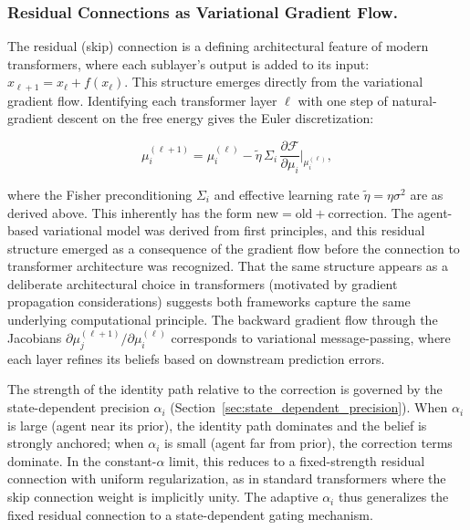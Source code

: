 \documentclass[twoside,11pt]{article}
\begin{document}
\subsubsection{Residual Connections as Variational Gradient Flow.}
\label{sec:residual_connections}

The residual (skip) connection is a defining architectural feature of modern transformers, where each sublayer's output is added to its input: $x_{\ell+1} = x_\ell + f(x_\ell)$. This structure emerges directly from the variational gradient flow. Identifying each transformer layer $\ell$ with one step of natural-gradient descent on the free energy gives the Euler discretization:

\begin{equation}
\mu_i^{(\ell+1)} = \mu_i^{(\ell)} - \tilde{\eta} \,\Sigma_i\,\frac{\partial \mathcal{F}}{\partial \mu_i}\bigg|_{\mu_i^{(\ell)}},
\label{eq:residual_gradient_flow}
\end{equation}

where the Fisher preconditioning $\Sigma_i$ and effective learning rate $\tilde{\eta} = \eta\sigma^2$ are as derived above. This inherently has the form $\text{new} = \text{old} + \text{correction}$. The agent-based variational model was derived from first principles, and this residual structure emerged as a consequence of the gradient flow before the connection to transformer architecture was recognized. That the same structure appears as a deliberate architectural choice in transformers (motivated by gradient propagation considerations) suggests both frameworks capture the same underlying computational principle. The backward gradient flow through the Jacobians $\partial\mu_j^{(\ell+1)}/\partial\mu_i^{(\ell)}$ corresponds to variational message-passing, where each layer refines its beliefs based on downstream prediction errors.

The strength of the identity path relative to the correction is governed by the state-dependent precision $\alpha_i$ (Section~\ref{sec:state_dependent_precision}). When $\alpha_i$ is large (agent near its prior), the identity path dominates and the belief is strongly anchored; when $\alpha_i$ is small (agent far from prior), the correction terms dominate. In the constant-$\alpha$ limit, this reduces to a fixed-strength residual connection with uniform regularization, as in standard transformers where the skip connection weight is implicitly unity. The adaptive $\alpha_i$ thus generalizes the fixed residual connection to a state-dependent gating mechanism.
\end{document}
